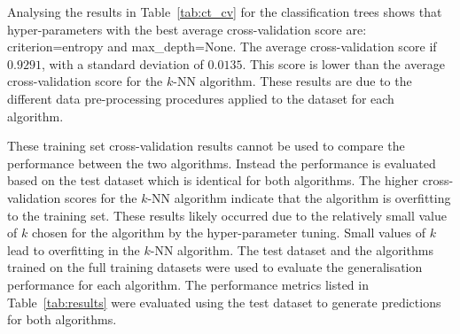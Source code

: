 \documentclass[conference]{IEEEtran}
\begin{document}
	Analysing the results in Table~\ref{tab:ct_cv} for the classification trees shows that hyper-parameters with the best average cross-validation score are: criterion=entropy and max\_depth=None. The average cross-validation score if $0.9291$, with a standard deviation of $0.0135$. This score is lower than the average cross-validation score for the $k$-NN algorithm. These results are due to the different data pre-processing procedures applied to the dataset for each algorithm.
	\begin{table}[hbtp]
		\caption{Cross-Validation F1 Macro Scores for Classification Tree Hyper-parameter Tuning}
		\label{tab:ct_cv}
		\centering
	\end{table}
	These training set cross-validation results cannot be used to compare the performance between the two algorithms. Instead the performance is evaluated based on the test dataset which is identical for both algorithms.	The higher cross-validation scores for the $k$-NN algorithm indicate that the algorithm is overfitting to the training set. These results likely occurred due to the relatively small value of $k$ chosen for the algorithm by the hyper-parameter tuning. Small values of $k$ lead to overfitting in the $k$-NN algorithm. The test dataset and the algorithms trained on the full training datasets were used to evaluate the generalisation performance for each algorithm. The performance metrics listed in Table~\ref{tab:results} were evaluated using the test dataset to generate predictions for both algorithms.
\end{document}
